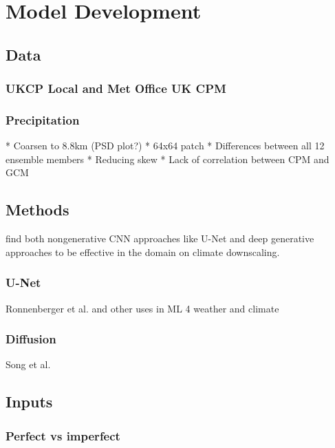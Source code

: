 \chapter{Model Development}
\label{chap:model-dev}

\section{Data}

\subsection{UKCP Local and Met Office UK CPM}

\subsection{Precipitation}

* Coarsen to 8.8km (PSD plot?)
* 64x64 patch
* Differences between all 12 ensemble members
* Reducing skew
* Lack of correlation between CPM and GCM

\section{Methods}

\textcite{rampal2024mlclimdownscalingreview} find both nongenerative CNN approaches like U-Net \parencite{ronnenberger2015unet} and deep generative approaches to be effective in the domain on climate downscaling.

\subsection{U-Net}

Ronnenberger et al. and other uses in ML 4 weather and climate

\subsection{Diffusion}

Song et al.

\section{Inputs}

\subsection{Perfect vs imperfect}

